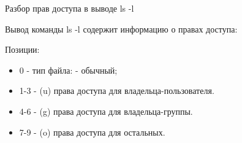 \begin{frame}[fragile]{Разбор прав доступа в выводе ls -l}

  Вывод команды \alert{ls -l} содержит информацию о правах доступа:

  

  Позиции:
  \begin{itemize}
    \item 0 - тип  файла: - обычный;
    \item 1-3 - (\alert{u}) права доступа для владельца-пользователя.
    \item 4-6 - (\alert{g}) права доступа для владельца-группы.
    \item 7-9 - (\alert{o}) права доступа для остальных.
  \end{itemize}
\end{frame}
